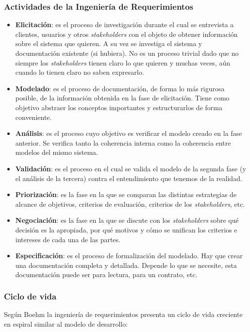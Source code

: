 \documentclass[]{article}
\begin{document}
\subsubsection{Actividades de la Ingeniería de Requerimientos}
\begin{itemize}
	\item \textbf{Elicitación}: es el proceso de investigación durante el cual se entrevista a clientes, usuarios y otros \textit{stakeholders} con el objeto de obtener información sobre el sistema que quieren. A su vez se investiga el sistema y documentación existente (si hubiera). No es un proceso trivial dado que no siempre los \textit{stakeholders} tienen claro lo que quieren y muchas veces, aún cuando lo tienen claro no saben expresarlo.
	\item \textbf{Modelado}: es el proceso de documentación, de forma lo más rigurosa posible, de la información obtenida en la fase de elicitación. Tiene como objetivo abstraer los conceptos importantes y estructurarlos de forma conveniente.
	\item \textbf{Análisis}: es el proceso cuyo objetivo es verificar el modelo creado en la fase anterior. Se verifica tanto la coherencia interna como la coherencia entre modelos del mismo sistema.
	\item \textbf{Validación}: es el proceso en el cual se valida el modelo de la segunda fase (y el análisis de la tercera) contra el entendimiento que tenemos de la realidad.
	\item \textbf{Priorización}: es la fase en la que se comparan las distintas estrategias de alcance de objetivos, criterios de evaluación, criterios de los \textit{stakeholders}, etc.
	\item \textbf{Negociación}: es la fase en la que se discute con los \textit{stakeholders} sobre qué decisión es la apropiada, por qué motivos y cómo se unifican los criterios e intereses de cada una de las partes.
	\item \textbf{Especificación}: es el proceso de formalización del modelado. Hay que crear una documentación completa y detallada. Depende lo que se necesite, esta documentación puede ser para lectura, para un contrato, etc.
\end{itemize}

\subsubsection{Ciclo de vida}
Según Boehm la ingeniería de requerimientos presenta un ciclo de vida creciente en espiral similar al modelo de desarrollo:
\end{document}
